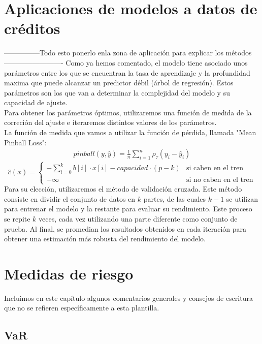 \documentclass[11pt]{book}
\newcommand{\clearemptydoublepage}{\newpage{\pagestyle{empty}\cleardoublepage}}
\theoremstyle{plain} %
\theoremstyle{definition} %
\begin{document}
\chapter{Aplicaciones de modelos a datos de créditos}
---------------Todo esto ponerlo enla zona de aplicación para explicar los métodos-------------------------
Como ya hemos comentado, el modelo tiene asociado unos parámetros entre los que se encuentran la tasa de aprendizaje y la profundidad
maxima que puede alcanzar un predictor débil (árbol de regresión). Estos parámetros son los que van a determinar la complejidad del modelo y su capacidad de ajuste.\\
Para obtener los parámetros óptimos, utilizaremos una función de medida de la correción del ajuste e iteraremos distintos valores de los parámetros.\\

La función de medida que vamos a utilizar la función de pérdida, llamada "Mean Pinball Loss":
\begin{align*}
   pinball(y, \hat{y}) = \frac{1}{n}\sum_{i=1}^n\rho_{\tau}(y_i-\hat{y}_i)
\end{align*}
\[
   \hat{c}(x) =
   \begin{cases}
      -\sum_{i=0}^{k} b[i] \cdot x[i] - capacidad\cdot(p-k) & \text{si caben en el tren} \\
      +\infty & \text{si no caben en el tren}
   \end{cases}
\]
Para su elección, utilizaremos el método de validación cruzada. Este método consiste en dividir el conjunto de datos en $k$ partes, de las cuales $k-1$ se utilizan para entrenar el modelo y la restante para evaluar su rendimiento. Este proceso se repite $k$ veces, cada vez utilizando una parte diferente como conjunto de prueba. Al final, se promedian los resultados obtenidos en cada iteración para obtener una estimación más robusta del rendimiento del modelo.\\
\clearemptydoublepage
\chapter{Medidas de riesgo}

Incluimos en este capítulo algunos comentarios generales y consejos de escritura 
que no se refieren específicamente a esta plantilla.

\section{VaR}
\end{document}
